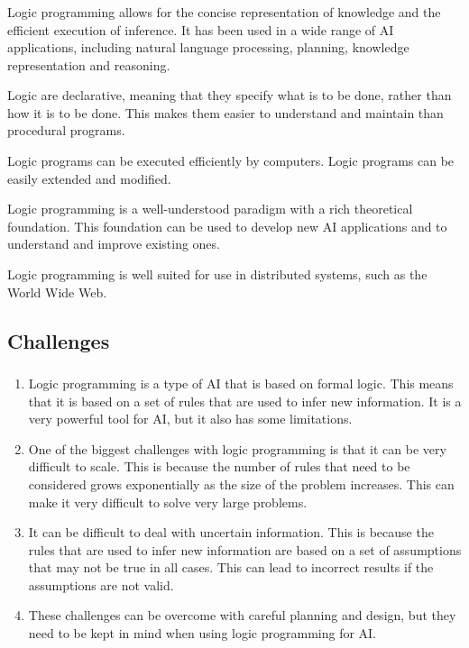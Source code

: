 \begin{frame}
	\frametitle{\insertsection}
	\framesubtitle{\insertsubsection}
	\justifying
		Logic programming allows for the concise representation of knowledge and the efficient execution of inference. It has been used in a wide range of AI applications, including natural language processing, planning, knowledge representation and reasoning.
		
		Logic are declarative, meaning that they specify what is to be done, rather than how it is to be done. This makes them easier to understand and maintain than procedural programs.
		
		Logic programs can be executed efficiently by computers.
		Logic programs can be easily extended and modified.
		
		Logic programming is a well-understood paradigm with a rich theoretical foundation. This foundation can be used to develop new AI applications and to understand and improve existing ones.
		
		Logic programming is well suited for use in distributed systems, such as the World Wide Web.
\end{frame}

\subsection{Challenges}

\begin{frame}
	\frametitle{\insertsection}
	\framesubtitle{\insertsubsection}
	\justifying
	\begin{enumerate}
		\item Logic programming is a type of AI that is based on formal logic. This means that it is based on a set of rules that are used to infer new information. It is a very powerful tool for AI, but it also has some limitations.
		\item One of the biggest challenges with logic programming is that it can be very difficult to scale. This is because the number of rules that need to be considered grows exponentially as the size of the problem increases. This can make it very difficult to solve very large problems.
		\item It can be difficult to deal with uncertain information. This is because the rules that are used to infer new information are based on a set of assumptions that may not be true in all cases. This can lead to incorrect results if the assumptions are not valid.
		\item These challenges can be overcome with careful planning and design, but they need to be kept in mind when using logic programming for AI.
	\end{enumerate}
\end{frame}


